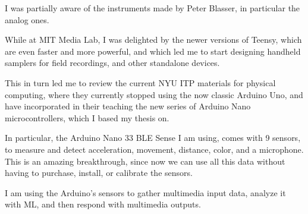 I was partially aware of the instruments made by Peter Blasser, in particular the analog ones.

While at MIT Media Lab, I was delighted by the newer versions of Teensy, which are even faster and more powerful, and which led me to start designing handheld samplers for field recordings, and other standalone devices.

This in turn led me to review the current \acrshort{NYU} \acrshort{ITP} materials for physical computing, where they currently stopped using the now classic Arduino Uno, and have incorporated in their teaching the new series of Arduino Nano microcontrollers, which I based my thesis on.

In particular, the Arduino Nano 33 \acrshort{BLE} Sense I am using, comes with 9 sensors, to measure and detect acceleration, movement, distance, color, and a microphone. This is an amazing breakthrough, since now we can use all this data without having to purchase, install, or calibrate the sensors.

I am using the Arduino's sensors to gather multimedia input data, analyze it with \acrshort{ML}, and then respond with multimedia outputs.

